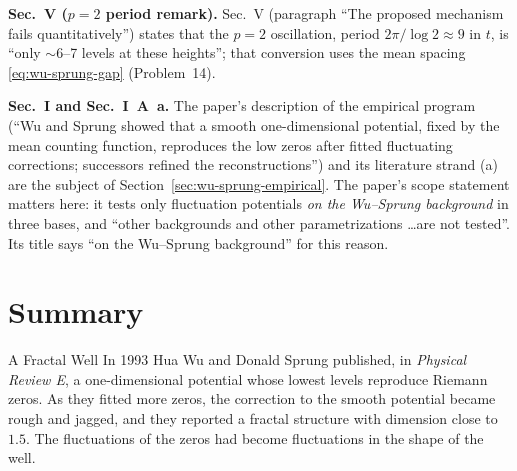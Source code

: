 \textbf{Sec.~V ($p=2$ period remark).} Sec.~V (paragraph ``The proposed mechanism fails quantitatively'') states that the $p=2$ oscillation, period $2\pi/\log2\approx9$ in $t$, is ``only $\sim$6--7 levels at these heights''; that conversion uses the mean spacing \eqref{eq:wu-sprung-gap} (Problem~14).

\textbf{Sec.~I and Sec.~I~A~a.} The paper's description of the empirical program (``Wu and Sprung showed that a smooth one-dimensional potential, fixed by the mean counting function, reproduces the low zeros after fitted fluctuating corrections; successors refined the reconstructions'') and its literature strand (a) are the subject of Section~\ref{sec:wu-sprung-empirical}. The paper's scope statement matters here: it tests only fluctuation potentials \emph{on the Wu--Sprung background} in three bases, and ``other backgrounds and other parametrizations \dots are not tested''. Its title says ``on the Wu--Sprung background'' for this reason.

\section{Summary}
\begin{didyouknow}{A Fractal Well}
In 1993 Hua Wu and Donald Sprung published, in \emph{Physical Review E}, a one-dimensional potential whose lowest levels reproduce Riemann zeros. As they fitted more zeros, the correction to the smooth potential became rough and jagged, and they reported a fractal structure with dimension close to $1.5$. The fluctuations of the zeros had become fluctuations in the shape of the well.
\end{didyouknow}

